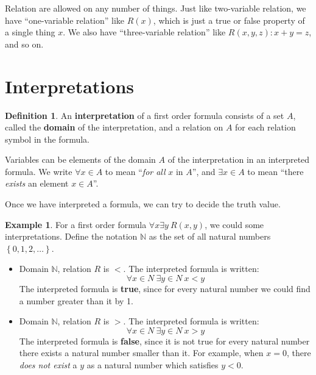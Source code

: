 \documentclass[11pt]{article}
\theoremstyle{definition}
\newtheorem{defn}{Definition}[subsection]
\newtheorem{eg}{Example}[subsection]
\begin{document}
Relation are allowed on any number of things. Just like two-variable relation, we have ``one-variable relation'' like $R(x)$, which is just a true or false property of a single thing $x$. We also have ``three-variable relation'' like $R(x,y,z):x+y=z$, and so on.


\section{Interpretations}
\begin{shaded}
    \begin{defn}
        An \textbf{interpretation} of a first order formula consists of a set $A$, called the \textbf{domain} of the interpretation, and a relation on $A$ for each relation symbol in the formula.
    \end{defn}
\end{shaded}

Variables can be elements of the domain $A$ of the interpretation in an interpreted formula. We write $\forall x \in A$ to mean ``\textit{for all} $x$ in $A$'', and $\exists x \in A$ to mean ``there \textit{exists} an element $x \in A$''.

Once we have interpreted a formula, we can try to decide the truth value.

\begin{eg}
    For a first order formula $\forall x \exists y \: R(x,y)$, we could some interpretations. Define the notation $\mathbb{N}$ as the set of all natural numbers $\left\{ 0,1,2,\dots \right\}$.

    \begin{itemize}
        \item Domain $\mathbb{N}$, relation $R$ is $<$. The interpreted formula is written: \begin{equation}
            \forall x \in N \: \exists y \in N \: x<y
        \end{equation}
        The interpreted formula is \textbf{true}, since for every natural number we could find a number greater than it by 1.
        \item Domain $\mathbb{N}$, relation $R$ is $>$. The interpreted formula is written: \begin{equation}
            \forall x \in N \: \exists y \in N \: x>y
        \end{equation}
        The interpreted formula is \textbf{false}, since it is not true for every natural number there exists a natural number smaller than it. For example, when $x=0$, there \textit{does not exist} a $y$ as a natural number which satisfies $y<0$.
    \end{itemize}

\end{eg}
\end{document}

